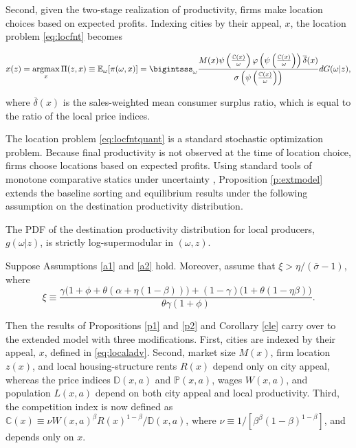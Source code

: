 Second, given the two-stage realization of productivity, firms make location choices based on expected profits. Indexing cities by their appeal, $x$, the location problem \eqref{eq:locfnt} becomes

\begin{equation}\label{eq:locfntquant}
    x(z) = \argmax_x \Pi(z,x) \equiv \mathbb{E}_\omega [\pi(\omega, x)] =  \displaystyle \bigintsss_\omega \frac{M(x) \psi\left(\frac{\mathbb{C}(x)}{\omega}\right) \varphi\left(\psi\left(\frac{\mathbb{C}(x)}{\omega}\right)\right)  \overline{\delta}(x)}{\sigma\left(\psi\left(\frac{\mathbb{C}(x)}{\omega}\right)\right)} dG(\omega | z), 
\end{equation}

where $\overline{\delta}(x)$ is the sales-weighted mean consumer surplus ratio, which is equal to the ratio of the local price indices.

The location problem \eqref{eq:locfntquant} is a standard stochastic optimization problem. Because final productivity is not observed at the time of location choice, firms choose locations based on expected profits. Using standard tools of monotone comparative statics under uncertainty \parencite{Athey02}, Proposition \ref{p:extmodel} extends the baseline sorting and equilibrium results under the following assumption on the destination productivity distribution.

\begin{assum}\label{a2}
The PDF of the destination productivity distribution for local producers, $g(\omega|z)$, is strictly log-supermodular in $(\omega, z)$.
\end{assum}

\begin{prop}\label{p:extmodel}
Suppose Assumptions \ref{a1} and \ref{a2} hold. Moreover, assume that $\xi>\eta/(\overline{\sigma}-1)$, where
    \begin{equation*}
    \xi \equiv \frac{\gamma\big(1+\phi+\theta(\alpha+\eta(1-\beta))\big)+(1-\gamma)\big(1+\theta(1-\eta\beta)\big)}{\theta\gamma(1+\phi)}.
    \end{equation*}

Then the results of Propositions \ref{p1} and \ref{p2} and Corollary \ref{cle} carry over to the extended model with three modifications. First, cities are indexed by their appeal, $x$, defined in \eqref{eq:localadv}. Second, market size $M(x)$, firm location $z(x)$, and local housing-structure rents $R(x)$ depend only on city appeal, whereas the price indices $\mathbb{D}(x,a)$ and $\mathbb{P}(x,a)$, wages $W(x,a)$, and population $L(x,a)$ depend on both city appeal and local productivity. Third, the competition index is now defined as $\mathbb{C}(x)\equiv \nu W(x,a)^\beta R(x)^{1-\beta}/\mathbb{D}(x,a)$, where $\nu\equiv 1/[\beta^\beta(1-\beta)^{1-\beta}]$, and depends only on $x$.
\end{prop}

